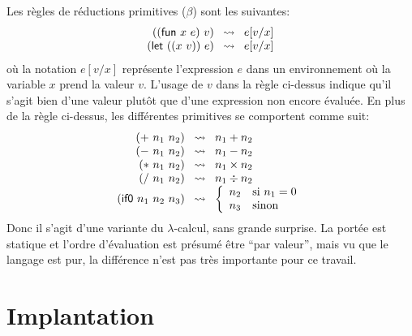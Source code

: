 \documentclass{article}
\begin{document}
Les règles de réductions primitives ($\beta$) sont les suivantes:
\begin{displaymath}
  \begin{array}{r@{\;\;\;\leadsto\;\;\;}l}
    ((\kw{fun}~x~e)~v) & e[v/x] \\
    (\kw{let}~((x~v))~e) & e[v/x]
  \end{array}
\end{displaymath}
où la notation $e[v/x]$ représente l'expression $e$ dans un
environnement où la variable $x$ prend la valeur $v$.  L'usage de $v$ dans
la règle ci-dessus indique qu'il s'agit bien d'une valeur plutôt que d'une
expression non encore évaluée.
En plus de la règle ci-dessus, les différentes primitives se
comportent comme suit:
\begin{displaymath}
  \begin{array}{r@{\;\;\;\leadsto\;\;\;}l}
    (+~n_1~n_2) & n_1 + n_2 \\
    (-~n_1~n_2) & n_1 - n_2 \\
    (*~n_1~n_2) & n_1 \times n_2 \\
    (/~n_1~n_2) & n_1 \div n_2 \\
    (\kw{if0}~n_1~n_2~n_3) & \left\{
    \begin{array}{ll}
      n_2 & \text{si $n_1 = 0$} \\
      n_3 & \text{sinon}
    \end{array}\right.
    \\
  \end{array}
\end{displaymath}
Donc il s'agit d'une variante du $\lambda$-calcul, sans grande surprise.
La portée est statique et l'ordre d'évaluation est présumé être ``par
valeur'', mais vu que le langage est pur, la différence n'est pas très
importante pour ce travail.

\section{Implantation}
\end{document}

